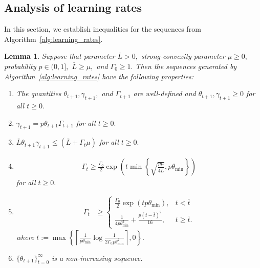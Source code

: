 \documentclass{article} %
\theoremstyle{plain}
\newtheorem{lemma}[theorem]{Lemma}
\theoremstyle{definition}
\theoremstyle{remark}
\newcommand{\eqdef}{:=}
\begin{document}
\subsection{Analysis of learning rates}
In this section, we establish inequalities for the sequences from Algorithm~\ref{alg:learning_rates}.
\begin{lemma}
  \label{lemma:learning_rates}
  Suppose that parameter $\bar{L} > 0,$ strong-convexity parameter $\mu \geq 0,$ probability $p \in (0, 1],$ $\bar{L} \geq \mu,$ and $\Gamma_0 \geq 1.$ Then the sequences generated by Algorithm~\ref{alg:learning_rates} have the following properties:
  \begin{enumerate}
    \item The quantities $\theta_{t+1}, \gamma_{t+1},$ and $\Gamma_{t+1}$ are well-defined and $\theta_{t+1}, \gamma_{t+1} \geq 0$ for all $t \geq 0.$
    \item $\gamma_{t+1} = p \theta_{t+1} \Gamma_{t+1}$ for all $t \geq 0.$
    \item $\bar{L} \theta_{t+1} \gamma_{t+1} \leq (\bar{L} + \Gamma_t \mu)$ for all $t \geq 0.$
    \item \begin{align*}
      \Gamma_{t} \geq \frac{\Gamma_0}{2}\exp\left(t \min\left\{\sqrt{\frac{p \mu}{4 \bar{L}}}, p\theta_{\min}\right\}\right)
    \end{align*}
    for all $t \geq 0.$
    \item 
    \begin{align*}
      \Gamma_{t} &\geq \begin{cases}
        \frac{\Gamma_0}{2} \exp \left(t p \theta_{\min}\right), &t < \bar{t} \\
        \frac{1}{4 p \theta_{\min}^2} + \frac{p (t - \bar{t})^2}{16}, &t \geq \bar{t}.
      \end{cases}
    \end{align*}
    where $\bar{t} \eqdef \max\left\{\left\lceil\frac{1}{p \theta_{\min}} \log \frac{1}{2 \Gamma_0 p \theta_{\min}^2}\right\rceil, 0\right\}.$
    \item $\{\theta_{t+1}\}_{t=0}^{\infty}$ is a non-increasing sequence.
  \end{enumerate}
\end{lemma}
\end{document}
